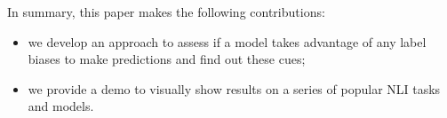 




In summary, this paper makes the following contributions:
\begin{itemize}
\item we develop an approach to assess if a model takes advantage 
of any label biases to make predictions and find out these cues;

\item we provide a demo to visually show results on a series of 
popular NLI tasks and models. 
\end{itemize}


















